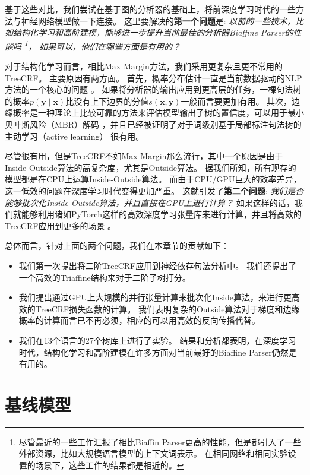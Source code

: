 基于这些对比，我们尝试在基于图的分析器的基础上，将前深度学习时代的一些方法与神经网络模型做一下连接。
这里要解决的\textbf{第一个问题}是:
\emph{
	以前的一些技术，比如结构化学习和高阶建模，能够进一步提升当前最佳的分析器Biaffine Parser的性能吗
	\footnote{
		尽管最近的一些工作汇报了相比Biaffin Parser更高的性能，但是都引入了一些外部资源，比如大规模语言模型的上下文词表示。
		在相同网络和相同实验设置的场景下，这些工作的结果都是相近的。
	}，
	如果可以，他们在哪些方面是有用的？
}

对于结构化学习而言，相比Max Margin方法，我们采用更复杂且更不常用的TreeCRF。
主要原因有两方面。
首先，概率分布估计一直是当前数据驱动的NLP方法的一个核心的问题 \citep{le-zuidema-2014-inside}。
如果将分析器的输出应用到更高层的任务，一棵句法树的概率$p(\boldsymbol{y}\mid\boldsymbol{x})$比没有上下边界的分值$s (\boldsymbol{x},\boldsymbol{y})$一般而言要更加有用。
其次，边缘概率是一种理论上比较可靠的方法来评估模型输出子树的置信度，可以用于最小贝叶斯风险（MBR）解码 \citep{smith-smith-2007-probabilistic}，并且已经被证明了对于词级别基于局部标注句法树的主动学习（active learning） \citep{li-etal-2016-active}很有用。

尽管很有用，但是TreeCRF不如Max Margin那么流行，其中一个原因是由于Inside-Outside算法的高复杂度，尤其是Outside算法。
据我们所知，所有现存的模型都是在CPU上运算Inside-Outside算法。
而由于CPU/GPU巨大的效率差异，这一低效的问题在深度学习时代变得更加严重。
这就引发了\textbf{第二个问题}:
\emph{我们是否能够批次化Inside-Outside算法，并且直接在GPU上进行计算？}
如果这样的话，我们就能够利用诸如PyTorch这样的高效深度学习张量库来进行计算，并且将高效的TreeCRF应用到更多的场景 \citep{cai-etal-2017-crf,le-zuidema-2014-inside}。

总体而言，针对上面的两个问题，我们在本章节的贡献如下：
\begin{itemize}
	\item 我们第一次提出将二阶TreeCRF应用到神经依存句法分析中。
	      我们还提出了一个高效的Triaffine结构来对于二阶子树打分。
	\item 我们提出通过GPU上大规模的并行张量计算来批次化Inside算法，来进行更高效的TreeCRF损失函数的计算。
	      我们表明复杂的Outside算法对于梯度和边缘概率的计算而言已不再必须，相应的可以用高效的反向传播代替。
	\item 我们在13个语言的27个树库上进行了实验。
	      结果和分析都表明，在深度学习时代，结构化学习和高阶建模在许多方面对当前最好的Biaffine Parser仍然是有用的。
\end{itemize}

\section{基线模型}
\label{sec:dep-basic-model}

